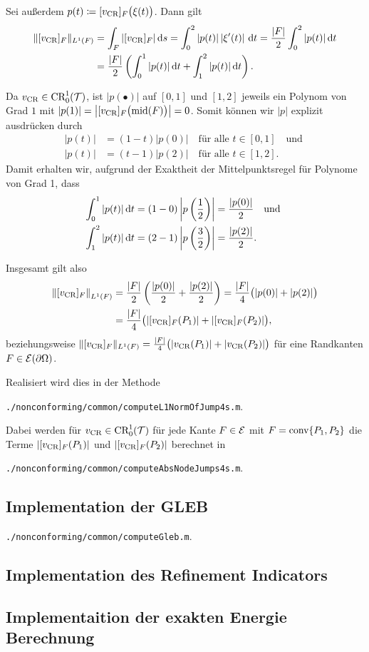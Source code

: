 Sei außerdem
$p(t)\coloneqq [v_\textup{CR}]_F\big(\xi(t)\big)$. Dann gilt
\begin{align*}
  \Vert [v_\textup{CR}]_F\Vert_{L^1(F)} 
  &=
  \int_F |[v_\textup{CR}]_F|\,\mathrm{d}s 
  = \int_0^2 |p(t)|\left|\xi'(t)\right|\,\mathrm{d}t
  = \frac{|F|}{2}\int_0^2 |p(t)|\,\mathrm{d}t\\
  &= \frac{|F|}{2}\left(\int_0^1 |p(t)|\,\mathrm{d}t + \int_1^2 |p(t)|\,\mathrm{d}t\right).
\end{align*}

Da $v_\textup{CR}\in\textup{CR}^1_0(\mathcal{T})$, ist $|p(\bullet)|$ auf $[0,1]$ und $[1,2]$ jeweils
ein Polynom von Grad $1$ mit $|p(1)|=\left|[v_\textup{CR}]_F\big(\textup{mid}(F)\big)\right|=0$. 
Somit können wir $|p|$ explizit ausdrücken durch
\begin{align*}
  |p(t)|&=(1-t)|p(0)| \quad\text{für alle }t\in[0,1] \quad\text{und }\\
  |p(t)|&=(t-1)|p(2)| \quad\text{für alle }t\in[1,2].
\end{align*}
Damit erhalten wir, aufgrund der Exaktheit der Mittelpunktsregel für Polynome
von Grad 1, dass
\begin{align*}
  \int_0^1 |p(t)|\,\mathrm{d}t 
  &= 
  (1-0)\left|p\left( \frac{1}{2} \right)\right|
  =
  \frac{|p(0)|}{2}\quad\text{und }\\
  \int_1^2 |p(t)|\,\mathrm{d}t 
  &= 
  (2-1)\left|p\left( \frac{3}{2} \right)\right|
  =
  \frac{|p(2)|}{2}.
\end{align*}

Insgesamt gilt also
\begin{align*}
  \left\Vert [v_\textup{CR}]_F\right\Vert_{L^1(F)} 
  &=
  \frac{|F|}{2}\left(\frac{|p(0)|}{2} + \frac{|p(2)|}{2}\right)
  =
  \frac{|F|}{4}\big(|p(0)|+|p(2)|\big)\\
  &= 
  \frac{|F|}{4}\big(|[v_\textup{CR}]_F(P_1)|+|[v_\textup{CR}]_F(P_2)|\big),
\end{align*}
beziehungsweise 
  $\Vert [v_\textup{CR}]_F\Vert_{L^1(F)} =
  \frac{|F|}{4}\big(|v_\textup{CR}(P_1)|+|v_\textup{CR}(P_2)|\big)$ für eine Randkanten
  $F\in\mathcal{E}(\partial\Omega)$.

Realisiert wird dies in der Methode
\begin{center}
  \texttt{./nonconforming/common/computeL1NormOfJump4s.m}.
\end{center}
Dabei werden für $v_\textup{CR}\in\textup{CR}^1_0(\mathcal{T})$ für jede Kante $F\in\mathcal{E}$ mit
$F=\textup{conv}\{P_1,P_2\}$ die Terme $|[v_\textup{CR}]_F(P_1)|$ und $|[v_\textup{CR}]_F(P_2)|$
berechnet in
\begin{center}
  \texttt{./nonconforming/common/computeAbsNodeJumps4s.m}.
\end{center}


\subsection{Implementation der GLEB}
\begin{center}
  \texttt{./nonconforming/common/computeGleb.m}.
\end{center}

\subsection{Implementation des Refinement Indicators}

\subsection{Implementaition der exakten Energie Berechnung}


